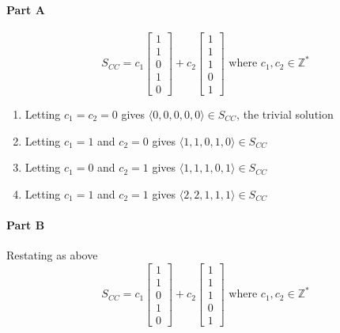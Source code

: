 \documentclass{article}
\begin{document}
            \paragraph{Part A}
                \[
                S_{CC}=
                c_1\begin{bmatrix}1\\1\\0\\1\\0\end{bmatrix}
                +
                c_2\begin{bmatrix}1\\1\\1\\0\\1\end{bmatrix}
                \text{ where }
                c_1, c_2 \in \mathbb{Z}^{*}
                \]
                \begin{enumerate}
                    \item Letting $c_1=c_2=0$ gives $\langle 0, 0, 0, 0, 0\rangle \in S_{CC}$, the trivial solution
                    \item Letting $c_1=1$ and $c_2=0$ gives $\langle 1, 1, 0, 1, 0\rangle \in S_{CC}$
                    \item Letting $c_1=0$ and $c_2=1$ gives $\langle 1, 1, 1, 0, 1\rangle \in S_{CC}$
                    \item Letting $c_1=1$ and $c_2=1$ gives $\langle 2, 2, 1, 1, 1\rangle \in S_{CC}$
                \end{enumerate}
            \paragraph{Part B}
                Restating as above
                \[
                S_{CC}=
                c_1\begin{bmatrix}1\\1\\0\\1\\0\end{bmatrix}
                +
                c_2\begin{bmatrix}1\\1\\1\\0\\1\end{bmatrix}
                \text{ where }
                c_1, c_2 \in \mathbb{Z}^{*}
                \]
\end{document}
